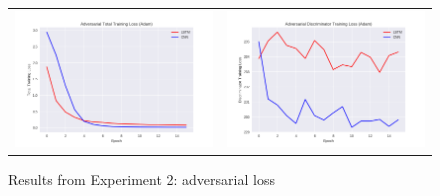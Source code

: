 \documentclass{sigkddExp}
\begin{document}
\begin{figure}[h]
\begin{tabular}{cc}
    \includegraphics[width=\columnwidth]{img/report_training_loss_adversarial_tot.png}
&   \includegraphics[width=\columnwidth]{img/report_training_loss_adversarial_dis.png}

\end{tabular}
\label{fig:exp2b}
\caption{Results from Experiment 2: adversarial loss}
\end{figure}
\end{document}
